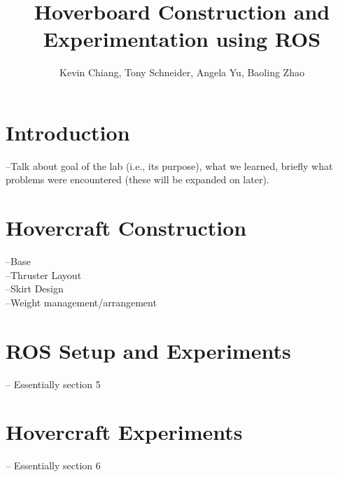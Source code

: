\documentclass[9pt]{article}
\title{Hoverboard Construction and Experimentation using ROS}
\author{Kevin Chiang, Tony Schneider, Angela Yu, Baoling Zhao}
\date{}
\begin{document}
\maketitle

\section*{Introduction}
--Talk about goal of the lab (i.e., its purpose), what we learned, briefly what problems were encountered (these will be expanded on later).
\section*{Hovercraft Construction}
--Base\\
--Thruster Layout\\
--Skirt Design\\
--Weight management/arrangement\\

\section*{ROS Setup and Experiments}
--  Essentially section 5

\section*{Hovercraft Experiments}
-- Essentially section 6
\end{document}
